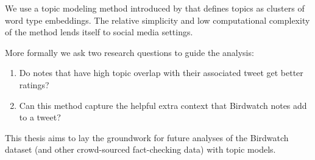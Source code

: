 \documentclass [11pt, proquest] {uwthesis}[2020/02/24]
\begin{document}
We use a topic modeling method introduced by \cite{sia-etal-2020-tired} that defines topics as clusters of word type embeddings. The relative simplicity and low computational complexity of the method lends itself to social media settings.

More formally we ask two research questions to guide the analysis:

\begin{enumerate}[label=\textbf{RQ\arabic*.}]
    \item  Do notes that have high topic overlap with their associated tweet get better
ratings?
    \item Can this method capture the helpful extra context that Birdwatch notes add to
a tweet?
\end{enumerate}
This thesis aims to lay the groundwork for future analyses of the Birdwatch dataset (and other crowd-sourced fact-checking data) with topic models.








\end{document}
